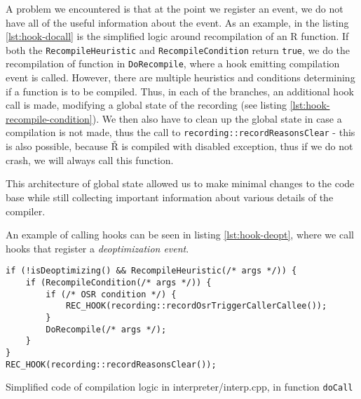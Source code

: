 A problem we encountered is that at the point we register an event, we do not have all of the useful information about the event. As an example, in the listing \ref{lst:hook-docall} is the simplified logic around recompilation of an R function. If both the \texttt{RecompileHeuristic} and \texttt{RecompileCondition} return \texttt{true}, we do the recompilation of function in \texttt{DoRecompile}, where a hook emitting compilation event is called. However, there are multiple heuristics and conditions determining if a function is to be compiled. Thus, in each of the branches, an additional hook call is made, modifying a global state of the recording (see listing \ref{lst:hook-recompile-condition}). We then also have to clean up the global state in case a compilation is not made, thus the call to \texttt{recording::recordReasonsClear} - this is also possible, because Ř is compiled with disabled exception, thus if we do not crash, we will always call this function.

This architecture of global state allowed us to make minimal changes to the code base while still collecting important information about various details of the compiler.

An example of calling hooks can be seen in listing \ref{lst:hook-deopt}, where we call hooks that register a \textit{deoptimization event}.

\begin{listing}
	\begin{verbatim}
if (!isDeoptimizing() && RecompileHeuristic(/* args */)) {
    if (RecompileCondition(/* args */)) {
        if (/* OSR condition */) {
            REC_HOOK(recording::recordOsrTriggerCallerCallee());
        }
        DoRecompile(/* args */);
    }
}
REC_HOOK(recording::recordReasonsClear());
  \end{verbatim}
	\caption{Simplified code of compilation logic in interpreter/interp.cpp, in function \texttt{doCall}}\label{lst:hook-docall}
\end{listing}

